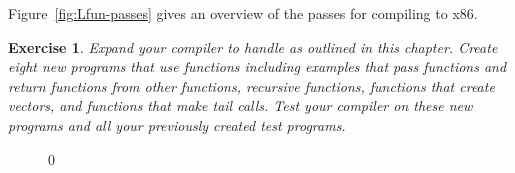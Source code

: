 \documentclass[7x10]{TimesAPriori_MIT}%
\def\racketEd{0}
\def\edition{1}
\newtheorem{exercise}[theorem]{Exercise}
\numberwithin{theorem}{chapter}
\numberwithin{definition}{chapter}
\numberwithin{equation}{chapter}
\begin{document}
Figure~\ref{fig:Lfun-passes} gives an overview of the passes for
compiling \LangFun{} to x86.

\begin{exercise}\normalfont\normalsize
Expand your compiler to handle \LangFun{} as outlined in this chapter.
Create eight new programs that use functions including examples that
pass functions and return functions from other functions, recursive
functions, functions that create vectors, and functions that make tail
calls. Test your compiler on these new programs and all your
previously created test programs.
\end{exercise}


\begin{figure}[tbp]
  \begin{tcolorbox}[colback=white]
{\if\edition\racketEd    
    }
\end{tcolorbox}
\end{figure}
\end{document}
